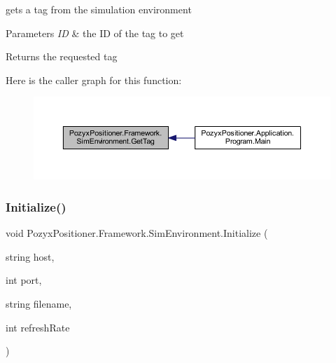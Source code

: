 gets a tag from the simulation environment 


\begin{DoxyParams}{Parameters}
{\em ID} & the ID of the tag to get\\
\hline
\end{DoxyParams}
\begin{DoxyReturn}{Returns}
the requested tag 
\end{DoxyReturn}
Here is the caller graph for this function\+:
\nopagebreak
\begin{figure}[H]
\begin{center}
\leavevmode
\includegraphics[width=350pt]{class_pozyx_positioner_1_1_framework_1_1_sim_environment_a2163b3c6c4794224ceba0e5279b7ee8e_icgraph}
\end{center}
\end{figure}
\mbox{\label{class_pozyx_positioner_1_1_framework_1_1_sim_environment_ad559e17b83e87b9121d3ffd9c08e10b4}} 
\subsubsection{\texorpdfstring{Initialize()}{Initialize()}\hspace{0.1cm}{\footnotesize\ttfamily [1/2]}}
{\footnotesize\ttfamily void Pozyx\+Positioner.\+Framework.\+Sim\+Environment.\+Initialize (\begin{DoxyParamCaption}\item[{string}]{host,  }\item[{int}]{port,  }\item[{string}]{filename,  }\item[{int}]{refresh\+Rate }\end{DoxyParamCaption})}



